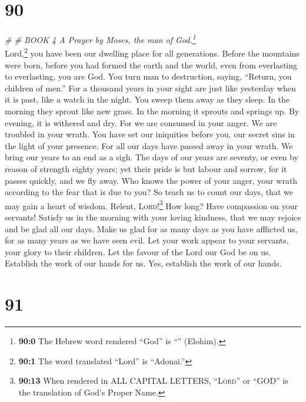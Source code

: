 \hypertarget{section-89}{%
\section{90}\label{section-89}}

\emph{\# \# BOOK 4 A Prayer by Moses, the man of God.\footnote{\textbf{90:0}
  The Hebrew word rendered ``God'' is ``'' (Elohim).}}\\
 Lord,\footnote{\textbf{90:1} The word translated ``Lord''
  is ``Adonai.''} you have been our dwelling place for all generations.
 Before the mountains were born, before you had formed the
earth and the world, even from everlasting to everlasting, you are God.
 You turn man to destruction, saying, ``Return, you
children of men.''  For a thousand years in your sight are
just like yesterday when it is past, like a watch in the night.
 You sweep them away as they sleep. In the morning they
sprout like new grass.  In the morning it sprouts and
springs up. By evening, it is withered and dry.  For we
are consumed in your anger. We are troubled in your wrath.
 You have set our iniquities before you, our secret sins
in the light of your presence.  For all our days have
passed away in your wrath. We bring our years to an end as a sigh.
 The days of our years are seventy, or even by reason of
strength eighty years; yet their pride is but labour and sorrow, for it
passes quickly, and we fly away.  Who knows the power of
your anger, your wrath according to the fear that is due to you?
 So teach us to count our days, that we may gain a heart
of wisdom.  Relent, \textsc{Lord}!\footnote{\textbf{90:13}
  When rendered in ALL CAPITAL LETTERS, ``\textsc{Lord}'' or ``GOD'' is
  the translation of God's Proper Name.} How long? Have compassion on
your servants!  Satisfy us in the morning with your
loving kindness, that we may rejoice and be glad all our days.
 Make us glad for as many days as you have afflicted us,
for as many years as we have seen evil.  Let your work
appear to your servants, your glory to their children. 
Let the favour of the Lord our God be on us. Establish the work of our
hands for us. Yes, establish the work of our hands.

\hypertarget{section-90}{%
\section{91}\label{section-90}}

